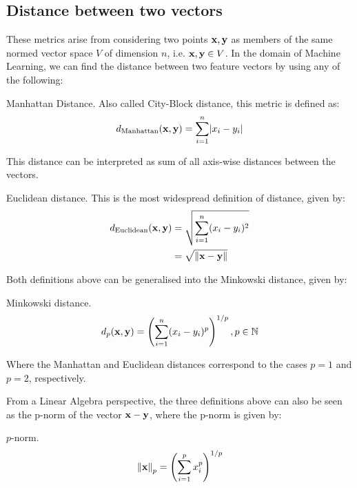 \documentclass[../main.tex]{subfiles} \label{chapter_soa}
\begin{document}
\subsection{Distance between two vectors}\label{subsection_eucdist}
These metrics arise from considering two points $\mathbf{x, y}$ as members of the same normed vector space $V$ of dimension $n$, i.e. $\mathbf{x,y} \in V$. In the domain of Machine Learning, we can find the distance between two feature vectors by using any of the following:
\begin{definition}{Manhattan Distance.} \label{def_manhattan}
Also called City-Block distance, this metric is defined as:
\begin{align*}
d_{\text{Manhattan}}(\mathbf{x}, \mathbf{y}) = \sum_{i=1}^n\lvert x_i-y_i\rvert
\end{align*}
\end{definition}
\par This distance can be interpreted as sum of all axis-wise distances between the vectors.
\begin{definition}{Euclidean distance.} \label{def_euclidean}
This is the most widespread definition of distance, given by:
\begin{align*}
d_{\text{Euclidean}}(\mathbf{x}, \mathbf{y}) &= \sqrt{\sum_{i=1}^n(x_i-y_i)^2}\\
&= \sqrt{\left\lVert\mathbf{x}-\mathbf{y}\right\rVert}
\end{align*}
\end{definition}
\par Both definitions above can be generalised into the Minkowski distance, given by:
\begin{definition}{Minkowski distance.} \label{def_minkowski}
\begin{align*}
d_{p}(\mathbf{x}, \mathbf{y}) = \left(\sum_{i=1}^n(x_i-y_i)^{p}\right)^{1/p}, p\in\mathbb{N}
\end{align*}
\end{definition}
\par Where the Manhattan and Euclidean distances correspond to the cases $p=1$ and $p=2$, respectively.
\par From a Linear Algebra perspective, the three definitions above can also be seen as the p-norm of the vector $\mathbf{x}-\mathbf{y}$, where the p-norm is given by:
\begin{definition}{$p$-norm.} \label{def_pnorm}
\begin{align*}
\left\lVert\mathbf{x}\right\rVert_p = \left(\sum_{i=1}^px_i^p\right)^{1/p}
\end{align*}
\end{definition}
\end{document}

